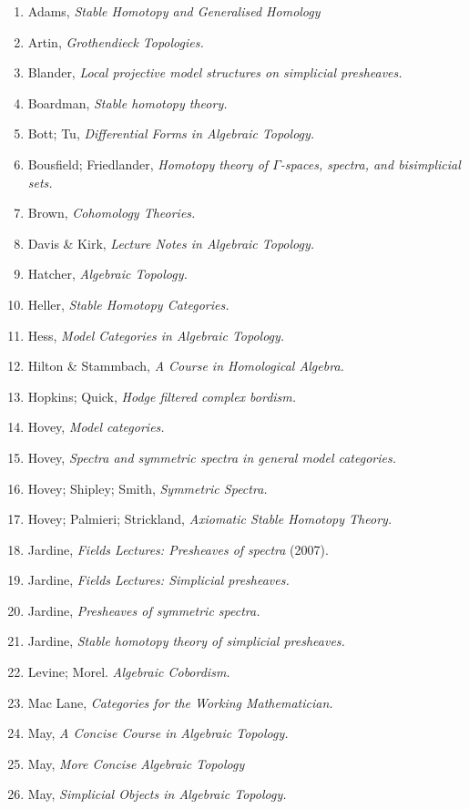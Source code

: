\documentclass{article}%
\newcounter{Objects}
\begin{document}
\begin{enumerate}
\item Adams, {\it Stable Homotopy and Generalised Homology}
\item Artin, {\it Grothendieck Topologies.}
\item Blander, {\it Local projective model structures on simplicial presheaves.}
\item Boardman, {\it Stable homotopy theory.}
\item Bott; Tu, {\it Differential Forms in Algebraic Topology.}
\item Bousfield; Friedlander, {\it Homotopy theory of $\Gamma$-spaces, spectra, and bisimplicial sets.}
\item Brown, {\it Cohomology Theories.} 
\item Davis \& Kirk, {\it Lecture Notes in Algebraic Topology.}
\item Hatcher, {\it Algebraic Topology.}
\item Heller, {\it Stable Homotopy Categories.}
\item Hess, {\it Model Categories in Algebraic Topology.}
\item Hilton \& Stammbach, {\it A Course in Homological Algebra.}
\item Hopkins; Quick, {\it Hodge filtered complex bordism.}
\item Hovey, {\it Model categories.}
\item Hovey, {\it Spectra and symmetric spectra in general model categories.}
\item Hovey; Shipley; Smith, {\it Symmetric Spectra.}
\item Hovey; Palmieri; Strickland, {\it Axiomatic Stable Homotopy Theory.}
\item Jardine, {\it Fields Lectures: Presheaves of spectra} (2007).
\item Jardine, {\it Fields Lectures: Simplicial presheaves.}
\item Jardine, {\it Presheaves of symmetric spectra.}
\item Jardine, {\it Stable homotopy theory of simplicial presheaves.}
\item Levine; Morel. {\it Algebraic Cobordism.}
\item Mac Lane, {\it Categories for the Working Mathematician.}
\item May, {\it A Concise Course in Algebraic Topology.}
\item May, {\it More Concise Algebraic Topology}
\item May, {\it Simplicial Objects in Algebraic Topology.}

\end{enumerate}
\end{document}
